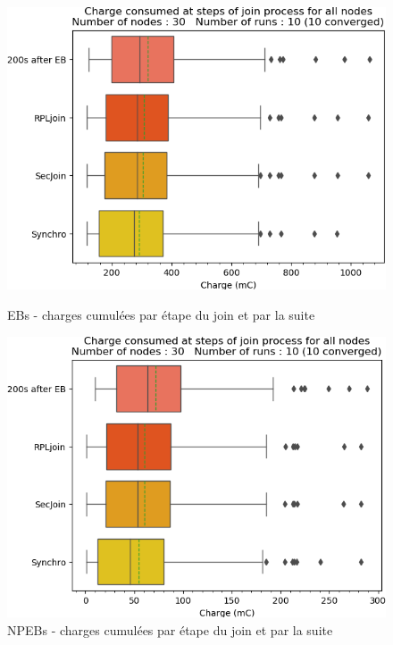 \documentclass[]{report}
\begin{document}
\begin{figure}[!ht]
	\begin{minipage}{0.49\textwidth}
		\centering
		\includegraphics[width=\textwidth]{results/EB/phase_charges}
		\caption{EBs - charges cumulées par étape du join et par la suite}
		\label{fig:EBcharges}
	\end{minipage}\hfill
	\begin{minipage}{0.5\textwidth}
		\centering
		\includegraphics[width=\textwidth]{results/NPEB/phase_charges}
		\caption{NPEBs - charges cumulées par étape du join et par la suite}
		\label{fig:NPEBcharges}
	\end{minipage}	
\end{figure}
\end{document}
